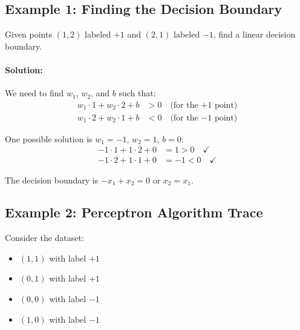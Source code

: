\documentclass{article}
\begin{document}
\subsection{Example 1: Finding the Decision Boundary}
Given points $(1,2)$ labeled $+1$ and $(2,1)$ labeled $-1$, find a linear decision boundary.

\paragraph{Solution:}
We need to find $w_1$, $w_2$, and $b$ such that:
\begin{align}
w_1 \cdot 1 + w_2 \cdot 2 + b &> 0 \quad \text{(for the $+1$ point)}\\
w_1 \cdot 2 + w_2 \cdot 1 + b &< 0 \quad \text{(for the $-1$ point)}
\end{align}

One possible solution is $w_1 = -1$, $w_2 = 1$, $b = 0$:
\begin{align}
-1 \cdot 1 + 1 \cdot 2 + 0 &= 1 > 0 \quad \checkmark\\
-1 \cdot 2 + 1 \cdot 1 + 0 &= -1 < 0 \quad \checkmark
\end{align}

The decision boundary is $-x_1 + x_2 = 0$ or $x_2 = x_1$.

\subsection{Example 2: Perceptron Algorithm Trace}
Consider the dataset:
\begin{itemize}
    \item $(1,1)$ with label $+1$
    \item $(0,1)$ with label $+1$
    \item $(0,0)$ with label $-1$
    \item $(1,0)$ with label $-1$
\end{itemize}
\end{document}
